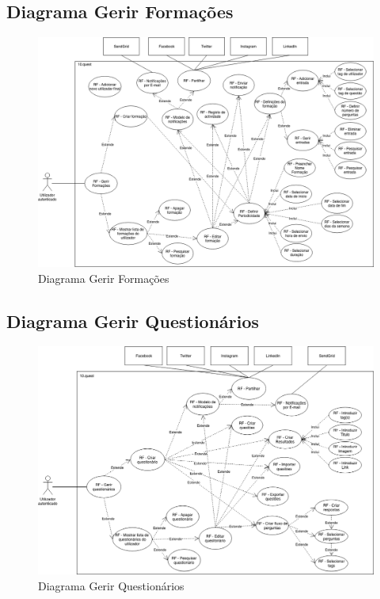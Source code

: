 \newpage

\subsection{Diagrama Gerir Formações}
\label{d:formacoes}
\begin{figure}[ht!]
	\begin{center}
		\includegraphics[width=1\textwidth]{img/rf/gerir-formacoes}
		\caption{Diagrama Gerir Formações}
		\label{fig:rf-gerir-formacoes}
	\end{center}
\end{figure}

\newpage

\subsection{Diagrama Gerir Questionários}
\label{d:quests}
\begin{figure}[ht!]
	\begin{center}
		\includegraphics[width=1\textwidth]{img/rf/gerir-quest}
		\caption{Diagrama Gerir Questionários}
		\label{fig:rf-gerir-quest}
	\end{center}
\end{figure}


